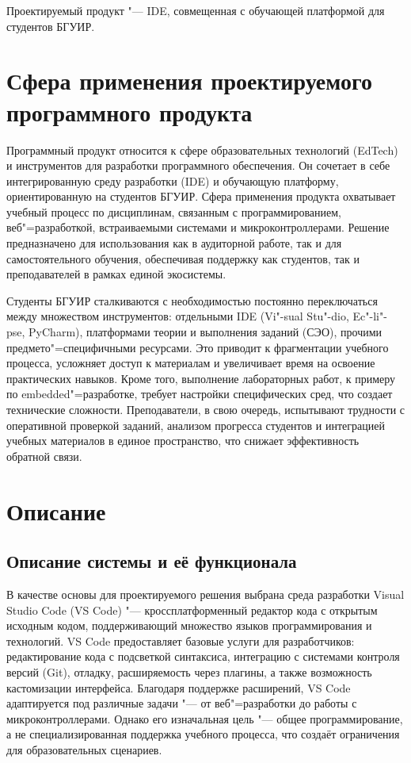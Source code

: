 \documentclass{bsuir}
\begin{document}
\maketitle
\mainmatter

Проектируемый продукт "--- IDE, совмещенная с обучающей платформой для студентов
БГУИР.

\section{Сфера применения проектируемого программного продукта}

Программный продукт относится к сфере образовательных технологий (EdTech) и
инструментов для разработки программного обеспечения. Он сочетает в себе
интегрированную среду разработки (IDE) и обучающую платформу, ориентированную на
студентов БГУИР. Сфера применения продукта охватывает учебный процесс по
дисциплинам, связанным с программированием, веб"=разработкой, встраиваемыми
системами и микроконтроллерами. Решение предназначено для использования как в
аудиторной работе, так и для самостоятельного обучения, обеспечивая поддержку
как студентов, так и преподавателей в рамках единой экосистемы.

Студенты БГУИР сталкиваются с необходимостью постоянно переключаться между
множеством инструментов: отдельными IDE (Vi"-sual Stu"-dio, Ec"-li"-pse,
PyCharm), платформами теории и выполнения заданий (СЭО), прочими
предмето"=специфичными ресурсами. Это приводит к фрагментации учебного процесса,
усложняет доступ к материалам и увеличивает время на освоение практических
навыков. Кроме того, выполнение лабораторных работ, к примеру по
embedded"=разработке, требует настройки специфических сред, что создает
технические сложности. Преподаватели, в свою очередь, испытывают трудности с
оперативной проверкой заданий, анализом прогресса студентов и интеграцией
учебных материалов в единое пространство, что снижает эффективность обратной
связи.

\section{Описание}

\subsection{Описание системы и её функционала}

В качестве основы для проектируемого решения выбрана среда разработки Visual
Studio Code (VS Code) "--- кроссплатформенный редактор кода с открытым исходным
кодом, поддерживающий множество языков программирования и технологий. VS Code
предоставляет базовые услуги для разработчиков: редактирование кода с подсветкой
синтаксиса, интеграцию с системами контроля версий (Git), отладку, расширяемость
через плагины, а также возможность кастомизации интерфейса. Благодаря поддержке
расширений, VS Code адаптируется под различные задачи "--- от веб"=разработки до
работы с микроконтроллерами. Однако его изначальная цель "--- общее
программирование, а не специализированная поддержка учебного процесса, что
создаёт ограничения для образовательных сценариев.
\end{document}
